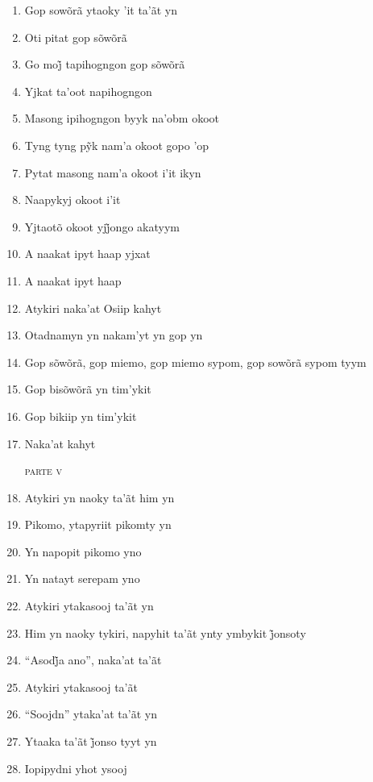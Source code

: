 \begin{enumerate}
 \item Gop sowõrã ytaoky 'it ta'ãt yn
 \item Oti pitat gop sõwõrã
 \item Go moj̃ tapihogngon gop sõwõrã
 \item Yjkat ta'oot napihogngon
 
 \begin{center}\end{center}
 
 \item Masong ipihogngon byyk na'obm okoot
 \item Tyng tyng pỹk nam’a okoot gopo ’op
 \item Pytat masong nam'a okoot i'it ikyn
 \item Naapykyj okoot i'it
 \item Yjtaotõ okoot yjj̃ongo akatyym
 \item A naakat ipyt haap yjxat
 \item A naakat ipyt haap
 
 \begin{center}\end{center}
 
 \item Atykiri naka'at Osiip kahyt
 \item Otadnamyn yn nakam'yt yn gop yn
 \item Gop sõwõrã, gop miemo, gop miemo sypom, gop sowõrã sypom tyym
 \item Gop bisõwõrã yn tim'ykit
 \item Gop bikiip yn tim'ykit
 \item Naka'at kahyt
 
 \begin{flushright}\textsc{parte v}\end{flushright}
 
 \item Atykiri yn naoky ta'ãt him yn
 \item Pikomo, ytapyriit pikomty yn
 \item Yn napopit pikomo yno
 \item Yn natayt serepam yno
 
 \begin{center}\end{center}
 
 \item Atykiri ytakasooj ta'ãt yn
 \item Him yn naoky tykiri, napyhit ta’ãt ynty ymbykit j̃onsoty
 \item ``Asodj̃a ano'', naka’at ta’ãt
 \item Atykiri ytakasooj ta'ãt
 \item ``Soojdn'' ytaka'at ta'ãt yn
 \item Ytaaka ta’ãt j̃onso tyyt yn
 \item Iopipydni yhot ysooj
 

\end{enumerate}
